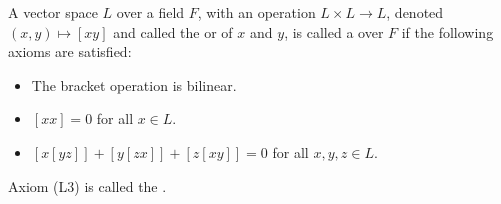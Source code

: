 A vector space $L$ over a field $F$, with an operation $L \times L \to L$, denoted $(x, y) \mapsto [xy]$ and called the  or  of $x$ and $y$, is called a  over $F$ if the following axioms are satisfied:

\begin{itemize}
\item[(L1)] The bracket operation is bilinear.
\item[(L2)] $[xx] = 0$ for all $x \in L$.
\item[(L3)] $[x[yz]] + [y[zx]] + [z[xy]] = 0$ for all $x, y, z \in L$.
\end{itemize}

Axiom (L3) is called the .
